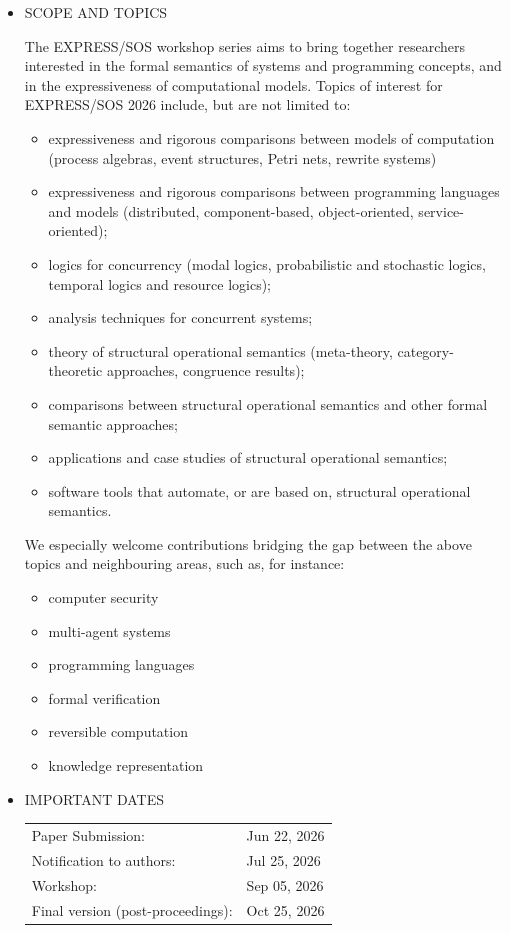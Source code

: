 \documentclass[prodmode,acmtecs]{acmsmall} %
\begin{document}
\begin{itemize}\item  SCOPE AND TOPICS 
 
  The EXPRESS/SOS workshop series aims to bring together researchers interested in the formal semantics of systems and programming concepts, and in the expressiveness of computational models. Topics of interest for EXPRESS/SOS 2026 include, but are not limited to: 
 
\begin{itemize}\item  expressiveness and rigorous comparisons between models of computation (process algebras, event structures, Petri nets, rewrite systems)
\item  expressiveness and rigorous comparisons between programming languages and models (distributed, component-based, object-oriented, service-oriented);
\item  logics for concurrency (modal logics, probabilistic and stochastic logics, temporal logics and resource logics); 
\item  analysis techniques for concurrent systems;
\item  theory of structural operational semantics (meta-theory, category-theoretic approaches, congruence results);
\item  comparisons between structural operational semantics and other formal semantic approaches;
\item  applications and case studies of structural operational semantics;
\item  software tools that automate, or are based on, structural operational semantics.
\end{itemize} 
  We especially welcome contributions bridging the gap between the above topics and neighbouring areas, such as, for instance: 
 
\begin{itemize}\item  computer security
\item  multi-agent systems
\item  programming languages
\item  formal verification
\item  reversible computation
\item  knowledge representation
\end{itemize} 
\item  IMPORTANT DATES 
 
\begin{tabulary}{\linewidth}{LL}Paper Submission:  & Jun 22, 2026 \\
Notification to authors:  & Jul 25, 2026 \\
Workshop:  & Sep 05, 2026 \\
Final version (post-proceedings):  & Oct 25, 2026 \\
\end{tabulary}
 

\end{itemize}
\end{document}
